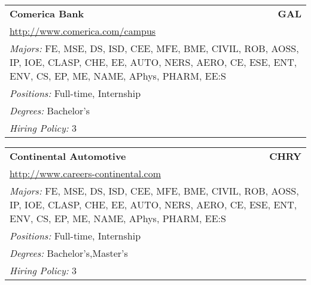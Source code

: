 \documentclass[twoside]{article}
\begin{document}
\begin{center}
\begin{multicols}{3}
\begin{FlushLeft}
\begin{minipage}{.9\columnwidth}
\end{minipage}
 
\begin{minipage}{.9\columnwidth}\begin{tabularx}{.95\columnwidth}{Xr}
                 {\Large\bf Comerica Bank} & {\Large\bf GAL}\\
    \multicolumn{2}{p{.95\columnwidth}}{\url{http://www.comerica.com/campus}}\\
    \multicolumn{2}{p{.95\columnwidth}}{\emph{Majors:} FE, MSE, DS, ISD, CEE, MFE, BME, CIVIL, ROB, AOSS, IP, IOE, CLASP, CHE, EE, AUTO, NERS, AERO, CE, ESE, ENT, ENV, CS, EP, ME, NAME, APhys, PHARM, EE:S}\\
    \multicolumn{2}{p{.95\columnwidth}}{\emph{Positions:} Full-time, Internship}\\
    \multicolumn{2}{p{.95\columnwidth}}{\emph{Degrees:} Bachelor's}\\
    \multicolumn{2}{p{.95\columnwidth}}{\emph{Hiring Policy:} 3}\\
    \end{tabularx}
    
\end{minipage}
 
\begin{minipage}{.9\columnwidth}\begin{tabularx}{.95\columnwidth}{Xr}
                 {\Large\bf Continental Automotive} & {\Large\bf CHRY}\\
    \multicolumn{2}{p{.95\columnwidth}}{\url{http://www.careers-continental.com}}\\
    \multicolumn{2}{p{.95\columnwidth}}{\emph{Majors:} FE, MSE, DS, ISD, CEE, MFE, BME, CIVIL, ROB, AOSS, IP, IOE, CLASP, CHE, EE, AUTO, NERS, AERO, CE, ESE, ENT, ENV, CS, EP, ME, NAME, APhys, PHARM, EE:S}\\
    \multicolumn{2}{p{.95\columnwidth}}{\emph{Positions:} Full-time, Internship}\\
    \multicolumn{2}{p{.95\columnwidth}}{\emph{Degrees:} Bachelor's,Master's}\\
    \multicolumn{2}{p{.95\columnwidth}}{\emph{Hiring Policy:} 3}\\
    \end{tabularx}
    
\end{minipage}
 

\end{FlushLeft}
\end{multicols}
\end{center}
\end{document}
